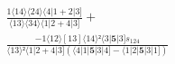 \documentclass[varwidth, border=5pt]{standalone}
\begin{document}
\begin{my}
$\begin{gathered}
\scriptscriptstyle\frac{1⟨14⟩⟨24⟩⟨4|1+2|3]}{⟨13⟩⟨34⟩⟨1|2+4|3]} +\\
\scriptscriptstyle\frac{-1⟨12⟩[13]⟨14⟩²⟨3|𝟓|3]s_{124}}{⟨13⟩²⟨1|2+4|3](⟨4|1|𝟓|3|4]-⟨1|2|𝟓|3|1])} \phantom{+}
\end{gathered}$
\end{my}
\end{document}
